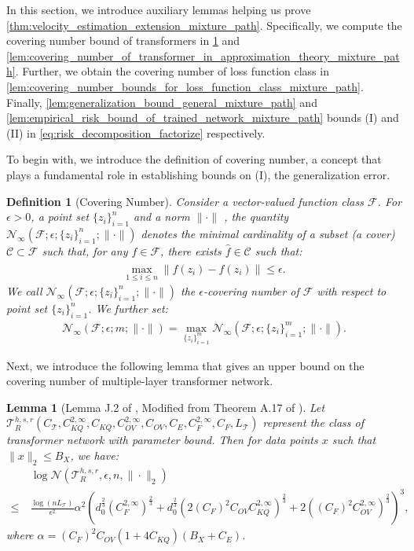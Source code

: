 \documentclass[12pt]{article}
\numberwithin{equation}{section}
\let\hat\widehat
\newcommand{\wh}{\widehat}
\renewcommand{\hat}{\wh}
\let\cite\citep
\theoremstyle{theoremstyle}
\newtheorem{lemma}{Lemma}[section]
\newtheorem{definition}{Definition}[section]
\numberwithin{equation}{section}
\numberwithin{theorem}{section}
\numberwithin{proposition}{section}
\numberwithin{definition}{section}
\numberwithin{lemma}{section}
\numberwithin{assumption}{section}
\numberwithin{remark}{section}
\begin{document}
In this section, we introduce auxiliary lemmas helping us prove \cref{thm:velocity_estimation_extension_mixture_path}.
Specifically, we compute the covering number bound of transformers in \cref{lem:covering_number_of_general_transformer_network_mixture_path} and \cref{lem:covering_number_of_transformer_in_approximation_theory_mixture_path}.
Further, we obtain the covering number of loss function class in \cref{lem:covering_number_bounds_for_loss_function_class_mixture_path}.
Finally, \cref{lem:generalization_bound_general_mixture_path} and \cref{lem:empirical_risk_bound_of_trained_network_mixture_path} bounds (I) and (II) in \eqref{eq:risk_decomposition_factorize} respectively.

To begin with, we introduce the definition of covering number, a concept that plays a fundamental role in establishing bounds on (I), the generalization error.
\begin{definition}[Covering Number]\label{def:definition_of_covering_number}
Consider a vector-valued function class $\mathcal{F}$. 
For $\epsilon>0$, a point set $\{z_i\}_{i=1}^n$ and a norm $\|\cdot\|$ , the quantity $\mathcal{N}_\infty(\mathcal{F};\epsilon;\{z_i\}_{i=1}^n;\|\cdot\|)$ denotes the minimal cardinality of a subset (a cover) $\mathcal{C}\subset\mathcal{F}$ such that, for any $f\in\mathcal{F}$, there exists $\hat{f}\in\mathcal{C}$ such that:
\begin{align*}
    \max_{1\leq i\leq n}\|f(z_i)-\hat{f}(z_i)\|\leq \epsilon.
\end{align*}
We call $\mathcal{N}_\infty(\mathcal{F};\epsilon;\{z_i\}_{i=1}^n;\|\cdot\|)$ the $\epsilon$-covering number of $\mathcal{F}$ with respect to point set $\{z_i\}_{i=1}^n$.
We further set:
\begin{align*}
    \mathcal{N}_\infty(\mathcal{F};\epsilon;m;\|\cdot\|)=\max_{\{z_i\}_{i=1}^m}\mathcal{N}_\infty(\mathcal{F};\epsilon;\{z_i\}_{i=1}^m;\|\cdot\|).
\end{align*}
\end{definition}

Next, we introduce the following lemma that gives an upper bound on the covering number of multiple-layer transformer network.

\begin{lemma}[Lemma J.2 of \cite{hu2024statistical}, Modified from Theorem A.17 of \cite{edelman2022inductivebiasesvariablecreation}]\label{lem:covering_number_of_general_transformer_network_mixture_path}
Let $\mathcal{T}^{h,s,r}_R(C_\mathcal{T},C^{2,\infty}_{KQ},C_{KQ},C^{2,\infty}_{OV},C_{OV},C_{E},C^{2,\infty}_{F},C_{F},L_\mathcal{T})$ represent the class of transformer network with parameter bound.
Then for data points $x$ such that $\|x\|_2\leq B_X$, we have:
\begin{align*}
    & ~ \log\mathcal{N}(\mathcal{T}^{h,s,r}_R,\epsilon,n,\|\cdot\|_2) \\
    \leq & ~
    \frac{\log(nL_\mathcal{T})}{\epsilon^2}\alpha^2(d_0^\frac{2}{3}(C_F^{2,\infty})^\frac{2}{3}+d_0^\frac{2}{3}(2(C_F)^2C_{OV}C_{KQ}^{2,\infty})^\frac{2}{3}+2((C_F)^2C_{OV}^{2,\infty})^\frac{2}{3})^3,
\end{align*}
where $\alpha=(C_F)^2C_{OV}(1+4C_{KQ})(B_X+C_E)$.
\end{lemma}
\end{document}
